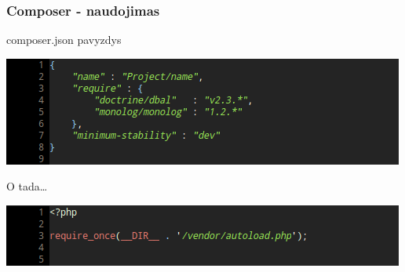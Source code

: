 \documentclass[12pt,a4paper]{beamer}
\begin{document}
\begin{frame}
    \frametitle{Composer - naudojimas}

    composer.json pavyzdys
    \begin{center}
        \includegraphics[scale=0.5]{img/composer_json.png}
    \end{center}
    \pause
    O tada\dots\\
    \begin{center}
        \includegraphics[scale=0.5]{img/autoload.png}
    \end{center}


\end{frame}
\end{document}
